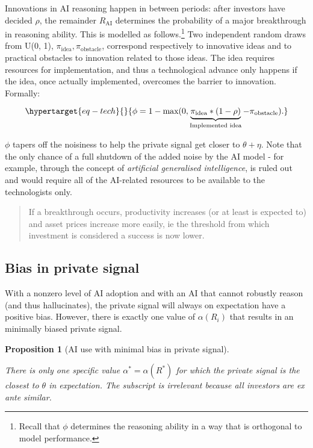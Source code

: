 \documentclass[
]{article}
\theoremstyle{plain}
\newtheorem{proposition}{Proposition}[section]
\theoremstyle{definition}
\theoremstyle{remark}
\begin{document}
Innovations in AI reasoning happen in between periods: after investors
have decided \(\rho\), the remainder \(R_{\text{AI}}\) determines the
probability of a major breakthrough in reasoning ability. This is
modelled as follows.\footnote{Recall that \(\phi\) determines the
  reasoning ability in a way that is orthogonal to model performance.}
Two independent random draws from U(0, 1),
\(\pi_{\text{idea}}, \pi_{\text{obstacle}}\), correspond respectively to
innovative ideas and to practical obstacles to innovation related to
those ideas. The idea requires resources for implementation, and thus a
technological advance only happens if the idea, once actually
implemented, overcomes the barrier to innovation. Formally:

\begin{equation}\protect\hypertarget{eq-tech}{}{
\phi = 1-\text{max}(0, \underbrace{\pi_{\text{idea}} * (1-\rho)}_{\text{Implemented idea}} - \pi_{\text{obstacle}}).
}\label{eq-tech}\end{equation}

\(\phi\) tapers off the noisiness to help the private signal get closer
to \(\theta + \eta\). Note that the only chance of a full shutdown of
the added noise by the AI model - for example, through the concept of
\emph{artificial generalised intelligence}, is ruled out and would
require all of the AI-related resources to be available to the
technologists only.

\begin{quote}
If a breakthrough occurs, productivity increases (or at least is
expected to) and asset prices increase more easily, ie the threshold
from which investment is considered a success is now lower.
\end{quote}

\hypertarget{bias-in-private-signal}{%
\subsection{Bias in private signal}\label{bias-in-private-signal}}

With a nonzero level of AI adoption and with an AI that cannot robustly
reason (and thus hallucinates), the private signal will always on
expectation have a positive bias. However, there is exactly one value of
\(\alpha(R_i)\) that results in an minimally biased private signal.

\begin{proposition}[AI use with minimal bias in private
signal]\protect\hypertarget{prp-alphainvestlowestbias}{}\label{prp-alphainvestlowestbias}

There is only one specific value \(\alpha^* = \alpha(R^*)\) for which
the private signal is the closest to \(\theta\) in expectation. The
subscript is irrelevant because all investors are ex ante similar.

\end{proposition}
\end{document}
